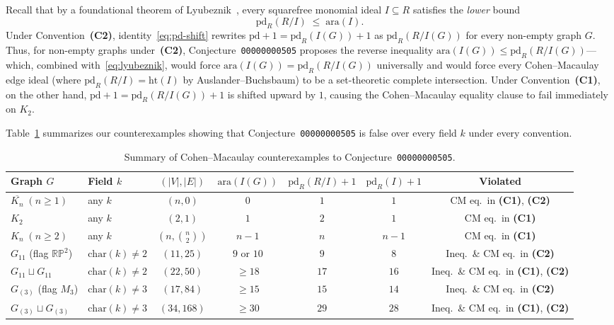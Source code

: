\documentclass[11pt,a4paper]{amsart}
\theoremstyle{plain}
\theoremstyle{definition}
\newcommand{\ara}{\mathrm{ara}}
\newcommand{\pd}{\mathrm{pd}}
\newcommand{\htid}{\mathrm{ht}}
\newcommand{\RP}{\mathbb{RP}}
\begin{document}
Recall that by a foundational theorem of Lyubeznik~\cite[Theorem~1]{Lyubeznik1988}, every squarefree monomial ideal $I \subseteq R$ satisfies the \emph{lower} bound
\begin{equation}\label{eq:lyubeznik}
  \pd_R(R/I) \;\le\; \ara(I).
\end{equation}
Under Convention~\textbf{(C2)}, identity~\eqref{eq:pd-shift} rewrites $\pd + 1 = \pd_R(I(G)) + 1$ as $\pd_R(R/I(G))$ for every non-empty graph $G$. Thus, for non-empty graphs under~\textbf{(C2)}, Conjecture~\texttt{00000000505} proposes the reverse inequality $\ara(I(G)) \le \pd_R(R/I(G))$---which, combined with~\eqref{eq:lyubeznik}, would force $\ara(I(G)) = \pd_R(R/I(G))$ universally and would force every Cohen--Macaulay edge ideal (where $\pd_R(R/I) = \htid(I)$ by Auslander--Buchsbaum) to be a set-theoretic complete intersection. Under Convention~\textbf{(C1)}, on the other hand, $\pd + 1 = \pd_R(R/I(G)) + 1$ is shifted upward by $1$, causing the Cohen--Macaulay equality clause to fail immediately on $K_2$.

Table~\ref{tab:summary} summarizes our counterexamples showing that Conjecture~\texttt{00000000505} is false over every field $k$ under every convention.

\begin{table}[ht]
\centering
\caption{Summary of Cohen--Macaulay counterexamples to Conjecture~\texttt{00000000505}.}\label{tab:summary}
\footnotesize
\setlength{\tabcolsep}{3pt}
\renewcommand{\arraystretch}{1.15}
\begin{tabular}{llccccc}
\hline
Graph $G$ & Field $k$ & $(|V|,|E|)$ & $\ara(I(G))$ & $\pd_R(R/I)+1$ & $\pd_R(I)+1$ & Violated \\
\hline
$\overline{K_n}\;(n \ge 1)$ & any $k$ & $(n,0)$ & $0$ & $1$ & $1$ & CM eq.\ in \textbf{(C1)}, \textbf{(C2)} \\
$K_2$ & any $k$ & $(2,1)$ & $1$ & $2$ & $1$ & CM eq.\ in \textbf{(C1)} \\
$K_n\;(n \ge 2)$ & any $k$ & $(n,\binom{n}{2})$ & $n-1$ & $n$ & $n-1$ & CM eq.\ in \textbf{(C1)} \\
$G_{11}$ (flag $\RP^2$) & $\mathrm{char}(k) \neq 2$ & $(11,25)$ & $9$ or $10$ & $9$ & $8$ & Ineq.\ \& CM eq.\ in \textbf{(C2)} \\
$G_{11} \sqcup G_{11}$ & $\mathrm{char}(k) \neq 2$ & $(22,50)$ & $\ge 18$ & $17$ & $16$ & Ineq.\ \& CM eq.\ in \textbf{(C1)}, \textbf{(C2)} \\
$G_{(3)}$ (flag $M_3$) & $\mathrm{char}(k) \neq 3$ & $(17,84)$ & $\ge 15$ & $15$ & $14$ & Ineq.\ \& CM eq.\ in \textbf{(C2)} \\
$G_{(3)} \sqcup G_{(3)}$ & $\mathrm{char}(k) \neq 3$ & $(34,168)$ & $\ge 30$ & $29$ & $28$ & Ineq.\ \& CM eq.\ in \textbf{(C1)}, \textbf{(C2)} \\
\hline
\end{tabular}
\end{table}
\end{document}
